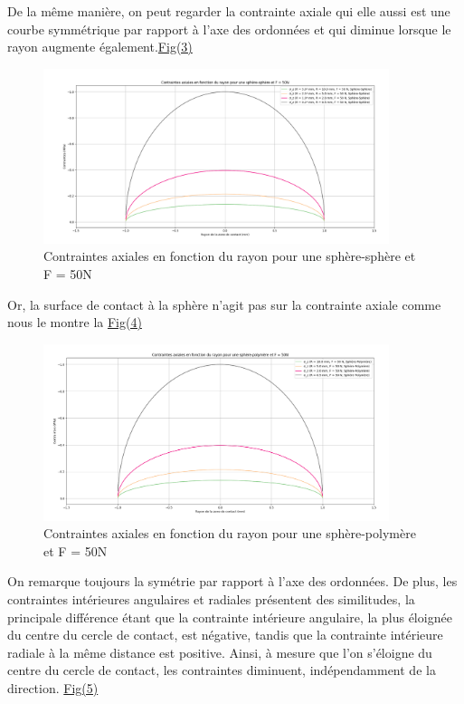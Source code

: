 \documentclass[a4paper,12pt]{article}
\begin{document}
\clearpage
De la même manière, on peut regarder la contrainte axiale qui elle aussi est une courbe symmétrique par rapport à l'axe des ordonnées et qui diminue lorsque le rayon augmente également.\hyperref[fig:mon_image3]{Fig(3)}
\begin{figure}[H] %
	\centering
	\includegraphics[width=0.9\textwidth]{ax1.png} %
	\caption{Contraintes axiales en fonction du rayon pour une sphère-sphère et F = 50N} %
	\label{fig:mon_image3} %
\end{figure}
Or, la surface de contact à la sphère n'agit pas sur la contrainte axiale comme nous le montre la \hyperref[fig:mon_image4]{Fig(4)}
\begin{figure}[H] %
	\centering
	\includegraphics[width=0.9\textwidth]{ax2.png} %
	\caption{Contraintes axiales en fonction du rayon pour une sphère-polymère et F = 50N} %
	\label{fig:mon_image4} %
\end{figure}
\clearpage
On remarque toujours la symétrie par rapport à l'axe des ordonnées. De plus, les contraintes intérieures angulaires et radiales présentent des similitudes, la principale différence étant que la contrainte intérieure angulaire, la plus éloignée du centre du cercle de contact, est négative, tandis que la contrainte intérieure radiale à la même distance est positive. Ainsi, à mesure que l'on s'éloigne du centre du cercle de contact, les contraintes diminuent, indépendamment de la direction. \hyperref[fig:mon_image5]{Fig(5)}
\end{document}
